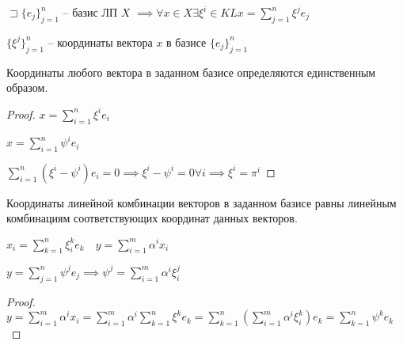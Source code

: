 \documentclass{book}
\theoremstyle{definition}
\begin{document}
\begin{definition}
    $\sqsupset \{e_j\}_{j=1}^n$ -- базис ЛП $X$  $\implies \forall x\in X \exists \xi^i\in KL x = \sum_{j=1}^{n} \xi^je_j$

    $\{\xi^j\}_{j=1}^n$ -- координаты вектора  $x$  в базисе  $\{e_j\}_{j=1}^n$
\end{definition}

\begin{lemma}
    Координаты любого вектора в заданном базисе определяются единственным образом.
\end{lemma}
\begin{proof}
    $x = \sum_{i=1}^{n} \xi^ie_i$ 

    $x = \sum_{i=1}^{n} \psi^ie_i$

    $\sum_{i=1}^{n} \left( \xi^i-\psi^i \right) e_i = 0 \implies  \xi^i-\psi^i = 0 \forall i \implies \xi^i = \pi^i$
\end{proof}

\begin{lemma}
    Координаты линейной комбинации векторов в заданном базисе равны линейным комбинациям соответствующих координат данных векторов.

    $x_i = \sum_{k=1}^{n} \xi_i^ke_k\quad y = \sum_{i=1}^{m} \alpha^ix_i$ 

    $y = \sum_{j=1}^{n} \psi^je_j \implies \psi^j = \sum_{i=1}^{m} \alpha^i\xi_i^j$
\end{lemma}
\begin{proof}
    $y = \sum_{i=1}^{m} \alpha^ix_i = \sum_{i=1}^{m} \alpha^i \sum_{k=1}^{n} \xi^ke_k = \sum_{k=1}^{n} \left( \sum_{i=1}^{m} \alpha^i\xi_i^k \right) e_k = \sum_{k=1}^{n} \psi^ke_k$
\end{proof}
\end{document}

